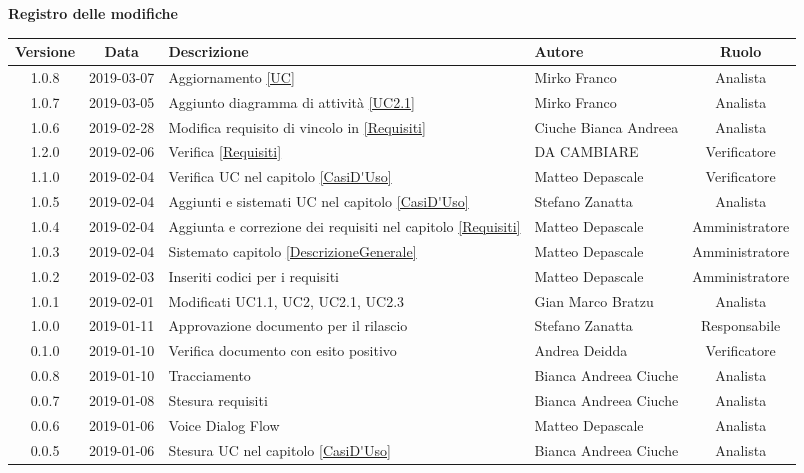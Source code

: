 	\begin{center}
		\textbf{Registro delle modifiche}
	\end{center}
	\begin{center}
		\begin{tabularx}{\textwidth}{|c|c|X|X|c|}
			\hline
			\textbf{Versione} & \textbf{Data} & \textbf{Descrizione} & \textbf{Autore} & \textbf{Ruolo} \\
			\hline
			1.0.8 & 2019-03-07 & Aggiornamento \ref{UC} & Mirko Franco & Analista \\
			\hline
			1.0.7 & 2019-03-05 & Aggiunto diagramma di attività \ref{UC2.1} & Mirko Franco & Analista \\
			\hline
			1.0.6 & 2019-02-28 & Modifica requisito di vincolo in \ref{Requisiti}& Ciuche Bianca Andreea & Analista \\
			\hline
			1.2.0 & 2019-02-06 & Verifica \ref{Requisiti}& DA CAMBIARE & Verificatore \\
			\hline
			1.1.0 & 2019-02-04 & Verifica UC nel capitolo \ref{CasiD'Uso}& Matteo Depascale & Verificatore\\
			\hline
			1.0.5 & 2019-02-04 & Aggiunti e sistemati UC nel capitolo \ref{CasiD'Uso}& Stefano Zanatta & Analista\\
			\hline
			1.0.4 & 2019-02-04 & Aggiunta e correzione dei requisiti nel capitolo \ref{Requisiti}& Matteo Depascale & Amministratore\\
			\hline
			1.0.3 & 2019-02-04 & Sistemato capitolo \ref{DescrizioneGenerale}& Matteo Depascale & Amministratore\\
			\hline
			1.0.2 & 2019-02-03 & Inseriti codici per i requisiti & Matteo Depascale & Amministratore\\
			\hline
			1.0.1 & 2019-02-01 & Modificati UC1.1, UC2, UC2.1, UC2.3 & Gian Marco Bratzu & Analista\\
			\hline
			1.0.0 & 2019-01-11 & Approvazione documento per il rilascio& Stefano Zanatta & Responsabile\\
			\hline
			0.1.0 & 2019-01-10 & Verifica documento con esito positivo& Andrea Deidda & Verificatore\\
			\hline
			0.0.8 & 2019-01-10 & Tracciamento& Bianca Andreea Ciuche& Analista\\
			\hline
			0.0.7 & 2019-01-08 & Stesura requisiti & Bianca Andreea Ciuche& Analista\\
			\hline
			0.0.6 & 2019-01-06 & Voice Dialog Flow & Matteo Depascale & Analista\\
			\hline
			0.0.5 & 2019-01-06 & Stesura UC nel capitolo \ref{CasiD'Uso}& Bianca Andreea Ciuche & Analista\\

\end{tabularx}
\end{center}
